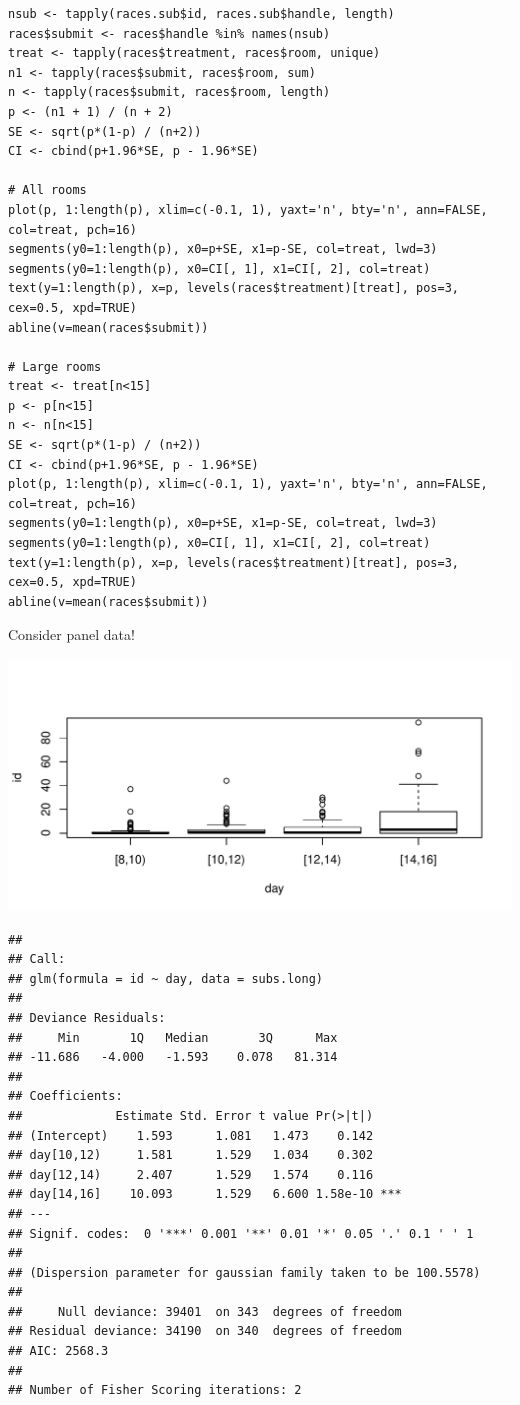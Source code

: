 \documentclass[12pt,]{article}
\theoremstyle{plain} %
\begin{document}
\begin{verbatim}
nsub <- tapply(races.sub$id, races.sub$handle, length)
races$submit <- races$handle %in% names(nsub)
treat <- tapply(races$treatment, races$room, unique)
n1 <- tapply(races$submit, races$room, sum)
n <- tapply(races$submit, races$room, length)
p <- (n1 + 1) / (n + 2)
SE <- sqrt(p*(1-p) / (n+2))
CI <- cbind(p+1.96*SE, p - 1.96*SE)

# All rooms
plot(p, 1:length(p), xlim=c(-0.1, 1), yaxt='n', bty='n', ann=FALSE, col=treat, pch=16)
segments(y0=1:length(p), x0=p+SE, x1=p-SE, col=treat, lwd=3)
segments(y0=1:length(p), x0=CI[, 1], x1=CI[, 2], col=treat)
text(y=1:length(p), x=p, levels(races$treatment)[treat], pos=3, cex=0.5, xpd=TRUE)
abline(v=mean(races$submit))

# Large rooms
treat <- treat[n<15]
p <- p[n<15]
n <- n[n<15] 
SE <- sqrt(p*(1-p) / (n+2))
CI <- cbind(p+1.96*SE, p - 1.96*SE)
plot(p, 1:length(p), xlim=c(-0.1, 1), yaxt='n', bty='n', ann=FALSE, col=treat, pch=16)
segments(y0=1:length(p), x0=p+SE, x1=p-SE, col=treat, lwd=3)
segments(y0=1:length(p), x0=CI[, 1], x1=CI[, 2], col=treat)
text(y=1:length(p), x=p, levels(races$treatment)[treat], pos=3, cex=0.5, xpd=TRUE)
abline(v=mean(races$submit))

\end{verbatim}

Consider panel data!

\includegraphics{Figures/unnamed-chunk-20-1.pdf}

\begin{verbatim}
## 
## Call:
## glm(formula = id ~ day, data = subs.long)
## 
## Deviance Residuals: 
##     Min       1Q   Median       3Q      Max  
## -11.686   -4.000   -1.593    0.078   81.314  
## 
## Coefficients:
##             Estimate Std. Error t value Pr(>|t|)    
## (Intercept)    1.593      1.081   1.473    0.142    
## day[10,12)     1.581      1.529   1.034    0.302    
## day[12,14)     2.407      1.529   1.574    0.116    
## day[14,16]    10.093      1.529   6.600 1.58e-10 ***
## ---
## Signif. codes:  0 '***' 0.001 '**' 0.01 '*' 0.05 '.' 0.1 ' ' 1
## 
## (Dispersion parameter for gaussian family taken to be 100.5578)
## 
##     Null deviance: 39401  on 343  degrees of freedom
## Residual deviance: 34190  on 340  degrees of freedom
## AIC: 2568.3
## 
## Number of Fisher Scoring iterations: 2
\end{verbatim}
\end{document}
